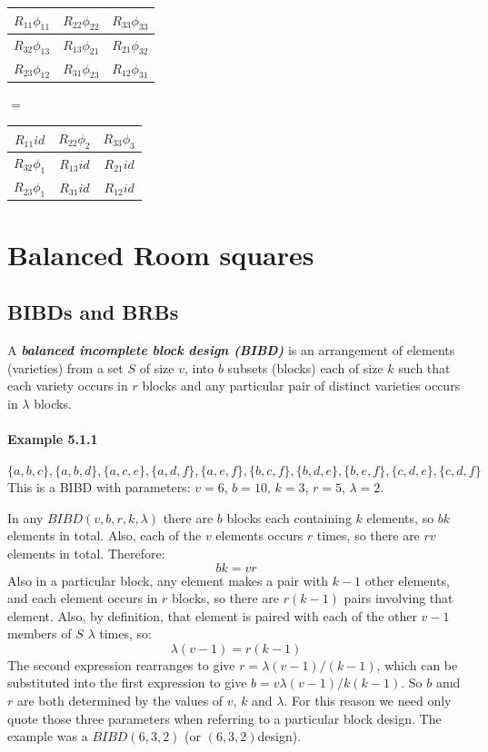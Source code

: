 \documentclass[
  12pt,
  a4paper]{book}
\begin{document}
\begin{longtable}[]{@{}ccc@{}}
\toprule
\(R_{11}\phi _{11}\) & \(R_{22}\phi _{22}\) &
\(R_{33}\phi _{33}\)\tabularnewline
\midrule
\endhead
\(R_{32}\phi _{13}\) & \(R_{13}\phi _{21}\) &
\(R_{21}\phi _{32}\)\tabularnewline
\(R_{23}\phi _{12}\) & \(R_{31}\phi _{23}\) &
\(R_{12}\phi _{31}\)\tabularnewline
\bottomrule
\end{longtable}

\(=\)

\begin{longtable}[]{@{}ccc@{}}
\toprule
\(R_{11}id\) & \(R_{22}\phi _{2}\) & \(R_{33}\phi _{3}\)\tabularnewline
\midrule
\endhead
\(R_{32}\phi _{1}\) & \(R_{13}id\) & \(R_{21}id\)\tabularnewline
\(R_{23}\phi _{1}\) & \(R_{31}id\) & \(R_{12}id\)\tabularnewline
\bottomrule
\end{longtable}

\hypertarget{balanced-room-squares}{%
\chapter{Balanced Room squares}\label{balanced-room-squares}}

\hypertarget{bibds-and-brbs}{%
\section{BIBDs and BRBs}\label{bibds-and-brbs}}

A \textbf{\emph{balanced incomplete block design (BIBD)}} is an
arrangement of elements (varieties) from a set \(S\) of size \(v\), into
\(b\) subsets (blocks) each of size \(k\) such that each variety occurs
in \(r\) blocks and any particular pair of distinct varieties occurs in
\(\lambda\) blocks.

\hypertarget{example-5.1.1}{%
\subsubsection{Example 5.1.1}\label{example-5.1.1}}

\[\{a,b,c\},\{a,b,d\},\{a,c,e\},\{a,d,f\},\{a,e,f\},\{b,c,f\},\{b,d,e\},\{b,e,f\},\{c,d,e\},\{c,d,f\}\]
This is a BIBD with parameters: \(v = 6\), \(b = 10\), \(k = 3\),
\(r = 5\), \(\lambda = 2\).

In any \(BIBD(v, b, r, k, \lambda)\) there are \(b\) blocks each
containing \(k\) elements, so \(bk\) elements in total. Also, each of
the \(v\) elements occurs \(r\) times, so there are \(rv\) elements in
total. Therefore: \[bk = vr\] Also in a particular block, any element
makes a pair with \(k - 1\) other elements, and each element occurs in
\(r\) blocks, so there are \(r(k - 1)\) pairs involving that element.
Also, by definition, that element is paired with each of the other
\(v - 1\) members of \(S\) \(\lambda\) times, so:
\[\lambda (v - 1) = r(k - 1)\] The second expression rearranges to give
\(r = \lambda (v - 1)/(k - 1)\), which can be substituted into the first
expression to give \(b=v\lambda (v - 1)/k(k - 1)\). So \(b\) amd \(r\)
are both determined by the values of \(v\), \(k\) and \(\lambda\). For
this reason we need only quote those three parameters when referring to
a particular block design. The example was a \(BIBD(6, 3, 2)\) (or
\((6, 3, 2)\)design).
\end{document}
